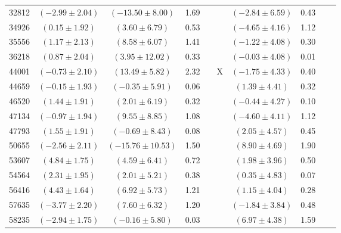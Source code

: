 \documentclass [10pt, twoside] {uwthesis}[2012/04/02]
\begin{document}
{\begin{longtable}[t]{|c|c|cccc|cccc|}
32812	&  $(	-2.99	  \pm  	2.04	)$  &  $(	-13.50	  \pm  	8.00	)$  &  	1.69	  &  		  &  		  &  $(	-2.84	  \pm  	6.59	)$  &  	0.43	  &  		  &  		  \\
34926	&  $(	0.15	  \pm  	1.92	)$  &  $(	3.60	  \pm  	6.79	)$  &  	0.53	  &  		  &  		  &  $(	-4.65	  \pm  	4.16	)$  &  	1.12	  &  		  &  		  \\
35556	&  $(	1.17	  \pm  	2.13	)$  &  $(	8.58	  \pm  	6.07	)$  &  	1.41	  &  		  &  		  &  $(	-1.22	  \pm  	4.08	)$  &  	0.30	  &  		  &  		  \\
36218	&  $(	0.87	  \pm  	2.04	)$  &  $(	3.95	  \pm  	12.02	)$  &  	0.33	  &  		  &  		  &  $(	-0.03	  \pm  	4.08	)$  &  	0.01	  &  		  &  		  \\
44001	&  $(	-0.73	  \pm  	2.10	)$  &  $(	13.49	  \pm  	5.82	)$  &  	2.32	  &  		  &  	X	  &  $(	-1.75	  \pm  	4.33	)$  &  	0.40	  &  		  &  		  \\
44659	&  $(	-0.15	  \pm  	1.93	)$  &  $(	-0.35	  \pm  	5.91	)$  &  	0.06	  &  		  &  		  &  $(	1.39	  \pm  	4.41	)$  &  	0.32	  &  		  &  		  \\
46520	&  $(	1.44	  \pm  	1.91	)$  &  $(	2.01	  \pm  	6.19	)$  &  	0.32	  &  		  &  		  &  $(	-0.44	  \pm  	4.27	)$  &  	0.10	  &  		  &  		  \\
47134	&  $(	-0.97	  \pm  	1.94	)$  &  $(	9.55	  \pm  	8.85	)$  &  	1.08	  &  		  &  		  &  $(	-4.60	  \pm  	4.11	)$  &  	1.12	  &  		  &  		  \\
47793	&  $(	1.55	  \pm  	1.91	)$  &  $(	-0.69	  \pm  	8.43	)$  &  	0.08	  &  		  &  		  &  $(	2.05	  \pm  	4.57	)$  &  	0.45	  &  		  &  		  \\
50655	&  $(	-2.56	  \pm  	2.11	)$  &  $(	-15.76	  \pm  	10.53	)$  &  	1.50	  &  		  &  		  &  $(	8.90	  \pm  	4.69	)$  &  	1.90	  &  		  &  		  \\
53607	&  $(	4.84	  \pm  	1.75	)$  &  $(	4.59	  \pm  	6.41	)$  &  	0.72	  &  		  &  		  &  $(	1.98	  \pm  	3.96	)$  &  	0.50	  &  		  &  		  \\
54564	&  $(	2.31	  \pm  	1.95	)$  &  $(	2.01	  \pm  	5.21	)$  &  	0.38	  &  		  &  		  &  $(	0.35	  \pm  	4.83	)$  &  	0.07	  &  		  &  		  \\
56416	&  $(	4.43	  \pm  	1.64	)$  &  $(	6.92	  \pm  	5.73	)$  &  	1.21	  &  		  &  		  &  $(	1.15	  \pm  	4.04	)$  &  	0.28	  &  		  &  		  \\
57635	&  $(	-3.77	  \pm  	2.20	)$  &  $(	7.60	  \pm  	6.32	)$  &  	1.20	  &  		  &  		  &  $(	-1.84	  \pm  	3.84	)$  &  	0.48	  &  		  &  		  \\
58235	&  $(	-2.94	  \pm  	1.75	)$  &  $(	-0.16	  \pm  	5.80	)$  &  	0.03	  &  		  &  		  &  $(	6.97	  \pm  	4.38	)$  &  	1.59	  &  		  &  		  \\ \hline

\end{longtable}}
\end{document}
